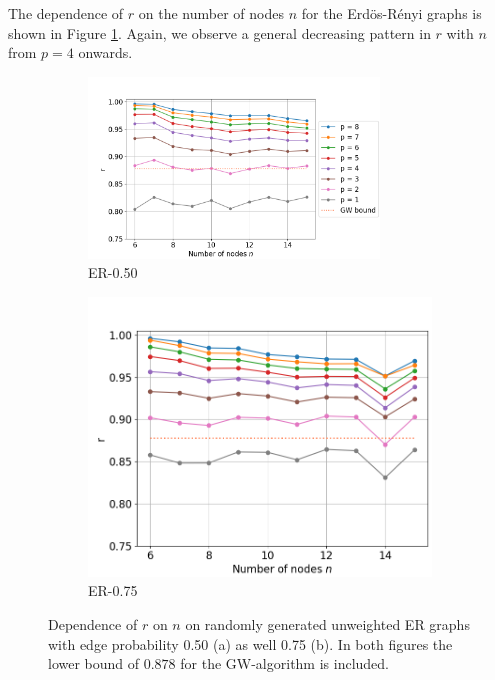 The dependence of $r$ on the number of nodes $n$ for the Erd\"os-R\'enyi graphs is shown in Figure \ref{fig:r-n_dependence_ER}. Again, we observe a general decreasing pattern in $r$ with $n$ from $p=4$ onwards. 

\begin{figure}[H]
	\begin{subfigure}[t]{0.6\textwidth}
		\centering
		\includegraphics[width=0.85\textwidth]{figures/interp/INT_n_dependence_ER050.png}
		\captionsetup{justification=centering}
		\caption{ER-0.50}
		
	\end{subfigure}
	\begin{subfigure}[t]{0.4\textwidth}
		\centering
		\includegraphics[width=\textwidth]{figures/interp/INT_n_dependence_ER075.png}
		\captionsetup{justification=centering}
		\caption{ER-0.75}
	\end{subfigure}
	\caption{Dependence of $r$ on $n$ on randomly generated unweighted ER graphs with edge probability 0.50 (a) as well 0.75 (b). In both figures the lower bound of $0.878$ for the GW-algorithm is included.}
	\label{fig:r-n_dependence_ER}
\end{figure}

